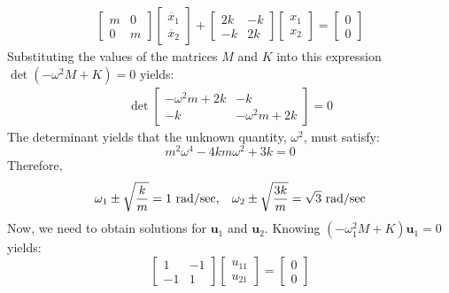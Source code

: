 \documentclass[12pt,letter]{article}
\numberwithin{ex}{section} %
\numberwithin{re}{section} %
\begin{document}
\begin{eqnarray}
	\begin{bmatrix} m & 0  \\  0 & m \end{bmatrix}\begin{bmatrix} \ddot{x_1} \\  \ddot{x_2} \end{bmatrix} + \begin{bmatrix} 2k & -k  \\  -k & 2k \end{bmatrix}\begin{bmatrix} x_1 \\  x_2 \end{bmatrix} = \begin{bmatrix} 0 \\  0 \end{bmatrix}
\end{eqnarray}
Substituting the values of the matrices $M$ and $K$ into this expression $\det(-\omega^2 M  + K) = 0$ yields: 
\begin{eqnarray}
\det\begin{bmatrix} -\omega^2 m + 2k & -k  \\  -k & -\omega^2 m + 2k \end{bmatrix}=0
\end{eqnarray}
The determinant yields that the unknown quantity, $\omega^2$, must satisfy:
\begin{equation}
m^2 \omega^4 - 4km\omega^2 + 3k = 0
\end{equation}
Therefore, 
\begin{equation}
\omega_1 \pm \sqrt{\frac{k}{m}}=1 \text{ rad/sec}, \hspace{2ex} \omega_2 \pm \sqrt{\frac{3k}{m}}=\sqrt{3} \text{ rad/sec}
\end{equation}
Now, we need to obtain solutions for $\mathbf{u}_1$ and $\mathbf{u}_2$. Knowing $(-\omega_1^2 M  + K)\mathbf{u}_1 =0$ yields:
\begin{equation}
	 \begin{bmatrix} 1 & -1 \\    -1  & 1 \end{bmatrix} 
	 \begin{bmatrix} u_{11}\\ u_{21}\end{bmatrix}=\begin{bmatrix} 0\\ 0\end{bmatrix}
\end{equation}
\end{document}
